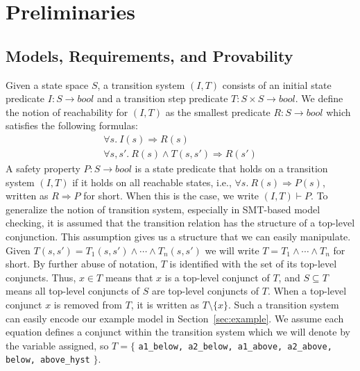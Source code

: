 \section{Preliminaries}
\label{sec:background}
\newcommand{\satisfies}{\vdash_{\!\!s}}
\newcommand{\nsatisfies}{\nvdash_{\!\!s}}
\newcommand{\bool}[0]{\mathit{bool}}
\newcommand{\reach}[0]{\mathit{R}}
\newcommand{\ite}[3]{\mathit{if}\ {#1}\ \mathit{then}\ {#2}\ \mathit{else}\ {#3}}


\subsection{Models, Requirements, and Provability}

Given a state space $S$, a transition system $(I,T)$ consists of an
initial state predicate $I : S \to \bool$ and a transition step
predicate $T : S \times S \to \bool$. We define the notion of
reachability for $(I, T)$ as the smallest predicate $\reach : S \to
\bool$ which satisfies the following formulas:
\begin{gather*}
  \forall s.~ I(s) \Rightarrow \reach(s) \\
  \forall s, s'.~ \reach(s) \land T(s, s') \Rightarrow \reach(s')
\end{gather*}
A safety property $P : S \to \bool$ is a state predicate that holds on a transition system $(I, T)$ if it holds on all
reachable states, i.e., $\forall s.~ \reach(s) \Rightarrow P(s)$,
written as $\reach \Rightarrow P$ for short. When this is the case, we
write $(I, T)\vdash P$. To generalize the notion of transition system, especially in SMT-based model checking, it is assumed that the transition relation has the structure of a top-level conjunction. This assumption gives us a structure that we can easily manipulate. Given $T(s, s') = T_1(s, s') \land \cdots \land T_n(s, s')$ we will write $T = T_1 \land \cdots \land T_n$ for short.
By further abuse of notation,
$T$ is identified with the set of its top-level conjuncts. Thus, $x \in
T$ means that $x$ is a top-level conjunct of $T$, and $S
\subseteq T$ means all top-level conjuncts of $S$ are top-level
conjuncts of $T$. When a top-level conjunct $x$ is removed from $T$, it is written as $T \setminus \{x\}$. Such a transition system can easily encode our example model in Section~\ref{sec:example}.  We assume each equation defines a conjunct within the transition system which we will denote by the variable assigned, so $T = \{$ {\small \texttt{a1\_below, a2\_below, a1\_above, a2\_above, below, above\_hyst}} $\}$.

